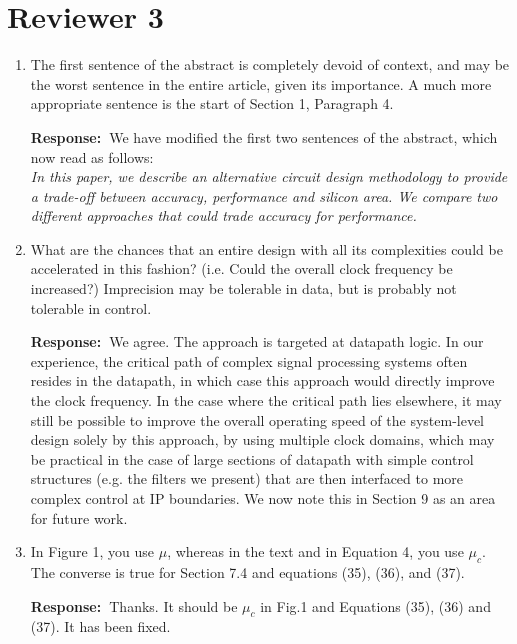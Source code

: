 \documentclass[a4paper, 11pt]{article}
\def\Response{\noindent \textbf{Response:~}}
\newcommand{\Question}[1]{\textcolor[rgb]{0.51,0.00,0.00}{#1}}
\newcommand{\PaperText}[1]{\emph{#1}}
\begin{document}
\section*{Reviewer 3}
\begin{enumerate}
  \item \Question{The first sentence of the abstract is completely devoid of context, and may be the worst sentence in the entire article, given its importance. A much more appropriate sentence is the start of Section 1, Paragraph 4.}
            
      \Response We have modified the first two sentences of the abstract, which now read as follows:\\
           
      \PaperText{In this paper, we describe an alternative circuit design methodology to provide a trade-off between accuracy, performance and silicon area. We compare two different approaches that could trade accuracy for performance.}\\

  \item \Question{What are the chances that an entire design with all its complexities could be accelerated in this fashion? (i.e. Could the overall clock frequency be increased?) Imprecision may be tolerable in data, but is probably not tolerable in control.}
            
      \Response We agree. The approach is targeted at datapath logic. In our experience, the critical path of complex signal processing systems often resides in the datapath, in which case this approach would directly improve the clock frequency. In the case where the critical path lies elsewhere, it may still be possible to improve the overall operating speed of the system-level design solely by this approach, by using multiple clock domains, which may be practical in the case of large sections of datapath with simple control structures (e.g. the filters we present) that are then interfaced to more complex control at IP boundaries. We now note this in Section 9 as an area for future work.\\
      
  \item \Question{In Figure 1, you use $\mu$, whereas in the text and in Equation 4, you use $\mu_c$.  The converse is true for Section 7.4 and equations (35), (36), and (37).}
      
      \Response Thanks. It should be $\mu_c$ in Fig.1 and Equations (35), (36) and (37). It has been fixed.\\
      

\end{enumerate}
\end{document}
